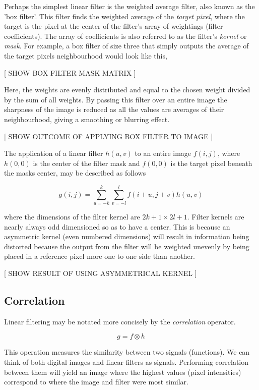 Perhaps the simplest linear filter is the weighted average filter, also known as the 'box filter'. This filter finds the weighted average of the \emph{target pixel}, where the target is the pixel at the center of the filter's array of weightings (filter coefficients). The array of coefficients is also referred to as the filter's \emph{kernel} or \emph{mask}. For example, a box filter of size three that simply outputs the average of the target pixels neighbourhood would look like this,

[ SHOW BOX FILTER MASK MATRIX ]

Here, the weights are evenly distributed and equal to the chosen weight divided by the sum of all weights. By passing this filter over an entire image the sharpness of the image is reduced as all the values are averages of their neighbourhood, giving a smoothing or blurring effect.

[ SHOW OUTCOME OF APPLYING BOX FILTER TO IMAGE ]


The application of a linear filter $h(u,v)$ to an entire image $f(i,j)$, where $h(0,0)$ is the center of the filter mask and $f(0,0)$ is the target pixel beneath the masks center, may be described as follows

\begin{equation} \label{eq:1}
g(i,j) = \sum_{u=-k}^{k}\sum_{v = -l}^{l}f(i+u,j+v)h(u,v)
\end{equation}


where the dimensions of the filter kernel are $2k+1 \times 2l+1$. Filter kernels are nearly always odd dimensioned so as to have a center. This is because an asymmetric kernel (even numbered dimensions) will result in information being distorted because the output from the filter will be weighted unevenly by being placed in a reference pixel more one to one side than another.

[ SHOW RESULT OF USING ASYMMETRICAL KERNEL ] 



\subsection{Correlation}

Linear filtering may be notated more concisely by the \emph{correlation} operator.

\[g = f \otimes h\]

This operation measures the similarity between two signals (functions). We can think of both digital images and linear filters as signals. Performing correlation between them will yield an image where the highest values (pixel intensities) correspond to where the image and filter were most similar\cite{optimalKernel}.


